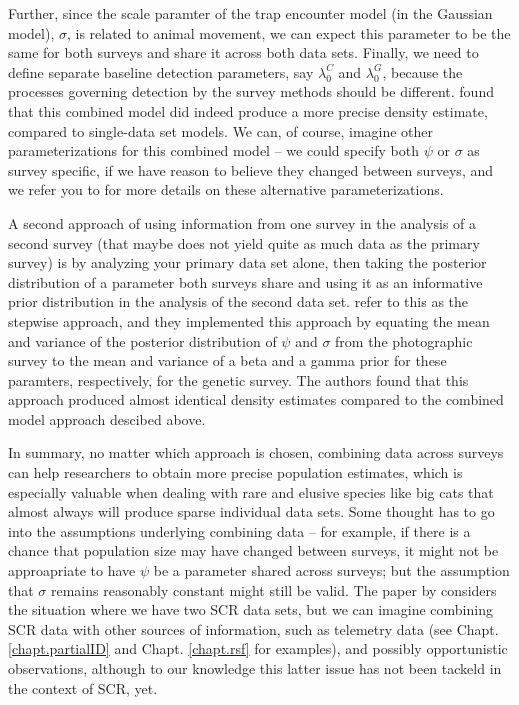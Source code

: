 Further, since the scale paramter of the trap encounter model (in
\citet{gopalaswamy_etal:2012mee} the Gaussian model), $\sigma$, is
related to animal movement, we can expect this parameter to be the
same for both surveys and share it across both data sets. Finally, we
need to define separate baseline detection parameters, say
$\lambda_{0}^{C}$ and $\lambda_{0}^{G}$, because the processes
governing detection by the survey methods should be
different. \citet{gopalaswamy_etal:2012mee} found that this combined
model did indeed produce a more precise density estimate, compared to
single-data set models.  We can, of course, imagine other
parameterizations for this combined model -- we could specify both
$\psi$ or $\sigma$ as survey specific, if we have reason to believe
they changed between surveys, and we refer you to
\citet{gopalaswamy_etal:2012mee} for more details on these alternative
parameterizations.

A second approach of using information from one survey in the analysis
of a second survey (that maybe does not yield quite as much data as
the primary survey) is by analyzing your primary data set alone, then
taking the posterior distribution of a parameter both surveys share
and using it as an informative prior distribution in the analysis of
the second data set. \citet{gopalaswamy_etal:2012mee} refer to this as
the stepwise approach, and they implemented this approach by equating
the mean and variance of the posterior distribution of $\psi$ and
$\sigma$ from the photographic survey to the mean and variance of a
beta and a gamma prior for these paramters, respectively, for the
genetic survey. The authors found that this approach produced almost
identical density estimates compared to the combined model approach
descibed above.

In summary, no matter which approach is chosen, combining data across
surveys can help researchers to obtain more precise population
estimates, which is especially valuable when dealing with rare and
elusive species like big cats that almost always will produce sparse
individual data sets. Some thought has to go into the assumptions
underlying combining data -- for example, if there is a chance that
population size may have changed between surveys, it might not be
approapriate to have $\psi$ be a parameter shared across surveys; but
the assumption that $\sigma$ remains reasonably constant might still
be valid. The paper by \citet{gopalaswamy_etal:2012mee} considers the
situation where we have two SCR data sets, but we can imagine
combining SCR data with other sources of information, such as
telemetry data (see Chapt. \ref{chapt.partialID} and
Chapt. \ref{chapt.rsf} for examples), and possibly opportunistic
observations, although to our knowledge this latter issue has not been
tackeld in the context of SCR, yet.


